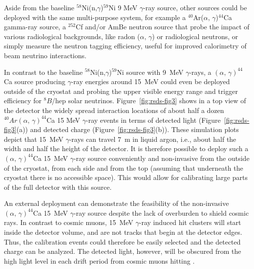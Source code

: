 Aside from the baseline $^{58}$Ni(n,$\gamma$)$^{59}$Ni 9 MeV $\gamma$-ray source, other sources could be deployed with the same multi-purpose system, for example a $^{40}$Ar($\alpha,\,\gamma$)$^{44}$Ca gamma-ray source, a $^{252}$Cf and/or AmBe neutron source that probe the impact of various radiological backgrounds, like radon ($\alpha,\,\gamma$) or radiological neutrons, or simply measure the neutron tagging efficiency, useful for improved calorimetry of beam neutrino interactions. 

In contrast to the baseline $^{58}$Ni(n,$\gamma$)$^{59}$Ni source with 9~MeV $\gamma$-rays, a $(\alpha,\,\gamma)^{44}$Ca source producing $\gamma$-ray energies around \SI{15}{MeV} could even be deployed outside of the cryostat and probing the upper visible energy range and trigger efficiency for $^{8}B$/hep solar neutrinos. Figure~\ref{fig:rsds-fig3}
shows in a top view of the detector the widely spread interaction locations of about half a dozen $^{40}Ar(\alpha,\,\gamma)^{44}$Ca 15 MeV $\gamma$-ray events in terms of detected light (Figure~\ref{fig:rsds-fig3}(a)) and  detected charge (Figure~\ref{fig:rsds-fig3}(b)). These simulation plots depict that 15~MeV $\gamma$-rays can travel \SI{7}{\m} in liquid argon, i.e., about half the width and half the height of the detector. It is therefore possible to deploy such a $(\alpha,\,\gamma)^{44}$Ca \SI{15}{MeV} $\gamma$-ray source conveniently and non-invasive from the outside of the cryostat, from each side and from the top (assuming that underneath the cryostat there is no accessible space). This would allow for calibrating large parts of the full detector with this source. 

An external  deployment can demonstrate the feasibility of the non-invasive $(\alpha,\,\gamma)^{44}$Ca \SI{15}{MeV} $\gamma$-ray source despite the lack of overburden to shield cosmic rays. In contrast to cosmic muons, \SI{15}{MeV} $\gamma$-ray induced hit clusters will start inside the detector volume, and are not tracks that begin at the detector edges. Thus, the  calibration events could therefore be easily selected and the detected charge can be analyzed. The detected light, however, will be obscured from the high light level in each drift period from cosmic muons hitting . 

